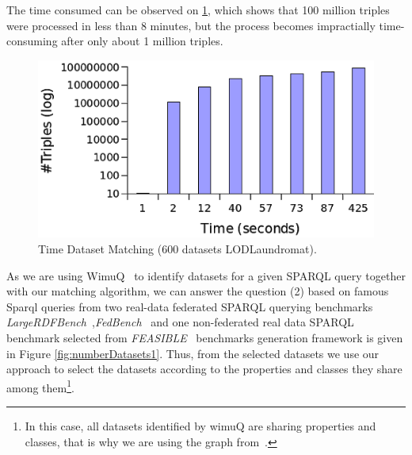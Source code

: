 \documentclass[sw]{iosart2x}
\begin{document}
The time consumed can be observed on \cref{fig:time600Laundromat}, which shows that 100 million triples were processed in less than 8 minutes, but the process becomes impractially time-consuming after only about 1 million triples.

\begin{figure}[htb] 
	\centering
	\includegraphics[width=\linewidth]{img/time.png}
	\caption{Time Dataset Matching (600 datasets LODLaundromat).}
	\label{fig:time600Laundromat}
\end{figure}

As we are using WimuQ~\cite{valdestilhas2019more} to identify datasets for a given SPARQL query together with our matching algorithm, we can answer the question (2) based on famous Sparql queries from two real-data federated SPARQL querying benchmarks \emph{LargeRDFBench}~\cite{largerdfbench2017},\emph{FedBench}~\cite{fedbench2011} and one non-federated real data SPARQL benchmark selected from \emph{FEASIBLE}~\cite{feasible2015} benchmarks generation framework is given in Figure \ref{fig:numberDatasets1}. Thus, from the selected datasets we use our approach to select the datasets according to the properties and classes they share among them\footnote{In this case, all datasets identified by wimuQ are sharing properties and classes, that is why we are using the graph from~\cite{valdestilhas2019more}.}.

\end{document}
